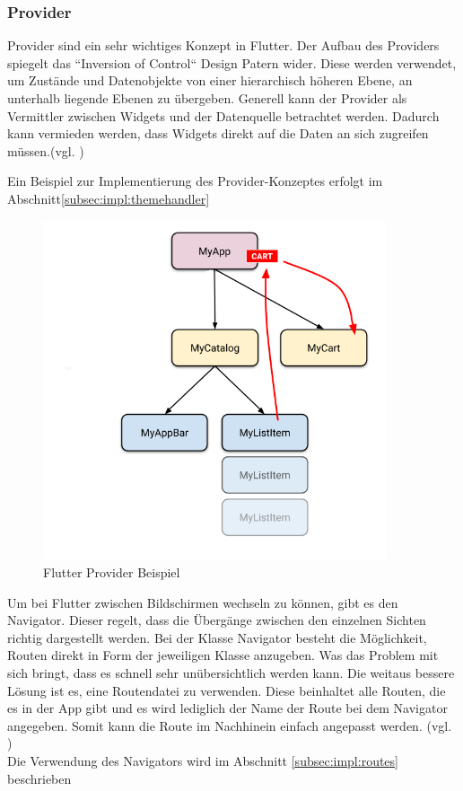 \newpage

\subsubsection{Provider}
Provider sind ein sehr wichtiges Konzept in Flutter. Der Aufbau des Providers spiegelt das ``Inversion of Control`` Design Patern wider. Diese werden verwendet, um Zustände und Datenobjekte von einer hierarchisch höheren Ebene, an unterhalb liegende Ebenen zu übergeben. Generell kann der Provider als Vermittler zwischen Widgets und der Datenquelle betrachtet werden. Dadurch kann vermieden werden, dass Widgets direkt auf die Daten an sich zugreifen müssen.(vgl. \cite{Flutter-Provider})

Ein Beispiel zur Implementierung des Provider-Konzeptes erfolgt im Abschnitt\ref{subsec:impl:themehandler}
\begin{figure}[h!]
\centering
\includegraphics[width=0.9\textwidth]{FLUTTER/images/ZB/provider_example.png}
\caption{Flutter Provider Beispiel \cite{Flutter-Provider-Example}}
\end{figure}






Um bei Flutter zwischen Bildschirmen wechseln zu können, gibt es den Navigator. Dieser regelt, dass die Übergänge zwischen den einzelnen Sichten richtig dargestellt werden. Bei der Klasse Navigator besteht die Möglichkeit, Routen direkt in Form der jeweiligen Klasse anzugeben. Was das Problem mit sich bringt, dass es schnell sehr unübersichtlich werden kann. Die weitaus bessere Lösung ist es, eine Routendatei zu verwenden. Diese beinhaltet alle Routen, die es in der App gibt und es wird lediglich der Name der Route bei dem Navigator angegeben. Somit kann die Route im Nachhinein einfach angepasst werden. (vgl. \cite{Navigator})
\\Die Verwendung des Navigators wird im Abschnitt \ref{subsec:impl:routes}  beschrieben

